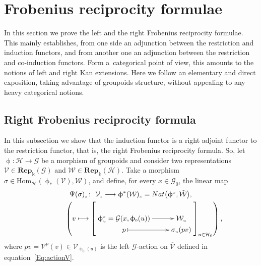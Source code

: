 \documentclass[11pt]{article}
\numberwithin{equation}{section}
\renewcommand{\hom}[3]{\mathrm{Hom}_{\Sscript{#1}}\left(#2, #3\right)}
\newcommand{\bara}[1]{\overline{#1}}
\newcommand{\Rep}[1]{\mathbf{Rep}_{\Sscript{\Bbbk}}(#1)}
\newcommand{\Go}{\cG_{\Sscript{0}}}
\newcommand{\Ho}{\cH_{\Sscript{0}}}
\newcommand{\Vx}{\cV_{\Sscript{x}}}
\newcommand{\cG}{{\mathcal G}}
\newcommand{\cH}{{\mathcal H}}
\newcommand{\cV}{{\mathcal V}}
\newcommand{\cW}{{\mathcal W}}
\newcommand{\phix}{\upphi^{\Sscript{x}}}
\newcommand{\Sscript}[1]{\scriptscriptstyle{#1}}
\newcommand{\phio}{\upphi_{\Sscript{0}}}
\begin{document}
\section{Frobenius reciprocity formulae}\label{sec:FRF}
In this section we prove the left and the right Frobenius reciprocity formulae. This mainly establishes, from one side an adjunction between the restriction and induction functors, and from another one an adjunction between the restriction and co-induction functors. Form a~categorical point of view, this amounts to the notions of left and right Kan extensions. Here we follow an elementary and direct exposition, taking advantage of groupoids structure, without appealing to any heavy categorical notions.

\subsection{Right Frobenius reciprocity formula}\label{ssec:Adj}
In this subsection we show that the induction functor is a right adjoint functor to the restriction functor, that is, the right Frobenius reciprocity formula. So, let $\upphi\colon \cH \to \cG$ be a morphism of groupoids and consider two representations $\cV \in \Rep{\cG}$ and $\cW \in \Rep{\cH}$. Take a morphism $ \sigma \in \hom{\cH}{\upphi_{*}(\cV)}{\cW}$, and define, for every $x \in \Go$, the linear map
\begin{gather}
\Psi(\sigma)_{\Sscript{x}}\colon \ \Vx \longrightarrow \upphi^*(\cW)_{\Sscript{x}}={\rm Nat}\big(\phix, \tilde{\cW}\big),\nonumber\\
\hphantom{\Psi(\sigma)_{\Sscript{x}}\colon}{} \ \left( v \longmapsto \left[ \xymatrix@R=0pt{ \upphi^{\Sscript{x}}_{\Sscript{u}} =\cG(x,\phio(u)) \ar@{->}^-{}[r] & \cW_{\Sscript{u}} \\ p \ar@{|->}^-{}[r] & \sigma_{\Sscript{u}} (p v) } \right]_{u \in \Ho} \right),\label{Eq:Psigma}
\end{gather}
where $pv=\cV^{\Sscript{p}}(v) \in \cV_{\Sscript{\phio(u)}}$ is the left $\cG$-action on $\bara{\cV}$ defined in equation~\eqref{Eq:actionV}.
\end{document}
